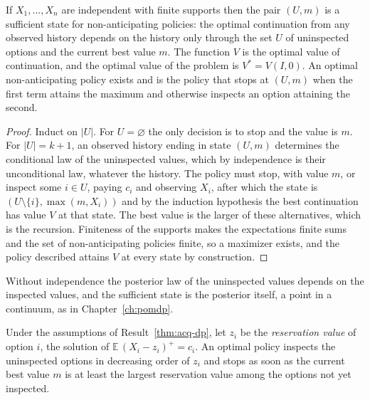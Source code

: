 \begin{newresult}\label{thm:acq-dp}
If $X_1,\dots,X_n$ are independent with finite supports then the pair $(U,m)$ is a sufficient state for non-anticipating policies: the optimal continuation from any observed history depends on the history only through the set $U$ of uninspected options and the current best value $m$. The function $V$ is the optimal value of continuation, and the optimal value of the problem is $V^{*}=V(I,0)$. An optimal non-anticipating policy exists and is the policy that stops at $(U,m)$ when the first term attains the maximum and otherwise inspects an option attaining the second.
\end{newresult}
\begin{proof}
Induct on $|U|$. For $U=\varnothing$ the only decision is to stop and the value is $m$. For $|U|=k+1$, an observed history ending in state $(U,m)$ determines the conditional law of the uninspected values, which by independence is their unconditional law, whatever the history. The policy must stop, with value $m$, or inspect some $i\in U$, paying $c_i$ and observing $X_i$, after which the state is $(U\setminus\{i\},\max(m,X_i))$ and by the induction hypothesis the best continuation has value $V$ at that state. The best value is the larger of these alternatives, which is the recursion. Finiteness of the supports makes the expectations finite sums and the set of non-anticipating policies finite, so a maximizer exists, and the policy described attains $V$ at every state by construction.
\end{proof}

Without independence the posterior law of the uninspected values depends on the inspected values, and the sufficient state is the posterior itself, a point in a continuum, as in Chapter~\ref{ch:pomdp}.

\begin{established}\label{thm:weitzman}
Under the assumptions of Result~\ref{thm:acq-dp}, let $z_i$ be the \emph{reservation value} of option $i$, the solution of $\mathbb E\,(X_i-z_i)^{+}=c_i$. An optimal policy inspects the uninspected options in decreasing order of $z_i$ and stops as soon as the current best value $m$ is at least the largest reservation value among the options not yet inspected.
\end{established}

